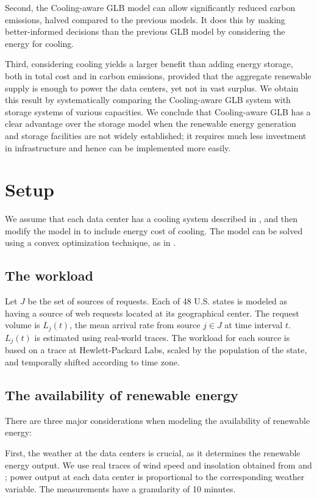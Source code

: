 \documentclass{acm_proc_article-sp}
\begin{document}
Second, the Cooling-aware GLB model can allow significantly reduced carbon emissions, halved compared to the previous models. It does this by making better-informed decisions than the previous GLB model by considering the energy for cooling.

Third, considering cooling yields a larger benefit than adding energy storage, both in total cost and in carbon emissions, provided that the aggregate renewable supply is enough to power the data centers, yet not in vast surplus. We obtain this result by systematically comparing the Cooling-aware GLB system with storage systems of various capacities. We conclude that Cooling-aware GLB has a clear advantage over the storage model when the renewable energy generation and storage facilities are not widely established; it requires much less investment in infrastructure and hence can be implemented more easily.

\section{Setup}
We assume that each data center has a cooling system described in \cite{adam:cooling}, and then modify the model in \cite{adam:GLB} to include energy cost of cooling. The model can be solved using a convex optimization technique, as in \cite{adam:GLBfull}.
\subsection{The workload}
Let $J$ be the set of sources of requests. Each of 48 U.S. states is modeled as having a source of web requests located at its geographical center. The request volume is $L_j(t)$, the mean arrival rate from source $j \in J$ at time interval $t$. $L_j(t)$ is estimated using real-world traces. The workload for each source is based on a trace at Hewlett-Packard Labs, scaled by the population of the state, and temporally shifted according to time zone.

\subsection{The availability of renewable energy}
There are three major considerations when modeling the availability of renewable energy:

First, the weather at the data centers is crucial, as it determines the renewable energy output. We use real traces of wind speed and insolation obtained from \cite{renew1} and \cite{renew2}; power output at each data center is proportional to the corresponding weather variable. The measurements have a granularity of 10 minutes.
\end{document}
